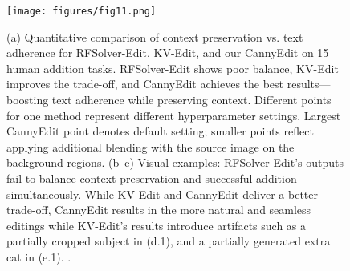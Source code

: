 \documentclass{article}
\begin{document}
\begin{figure}[t]
    \centering
    \texttt{[image: figures/fig11.png]}
  \caption{(a) Quantitative comparison of context preservation vs. text adherence for RFSolver-Edit, KV-Edit, and our CannyEdit on 15 human addition tasks. RFSolver-Edit shows poor balance, KV-Edit improves the trade-off, and CannyEdit achieves the best results—boosting text adherence while preserving context. Different points for one method represent different hyperparameter settings. Largest CannyEdit point denotes default setting; smaller points reflect applying additional blending with the source image on the background regions. (b–e) Visual examples: RFSolver-Edit's outputs fail to balance context preservation and successful addition simultaneously. While KV-Edit and CannyEdit deliver a better trade-off, CannyEdit results in the more natural and seamless editings while KV-Edit's results introduce artifacts such as a {partially cropped subject} in (d.1), and {a partially generated extra cat} in (e.1). .}
    \label{fig2}
\end{figure}

%
%
\end{document}

